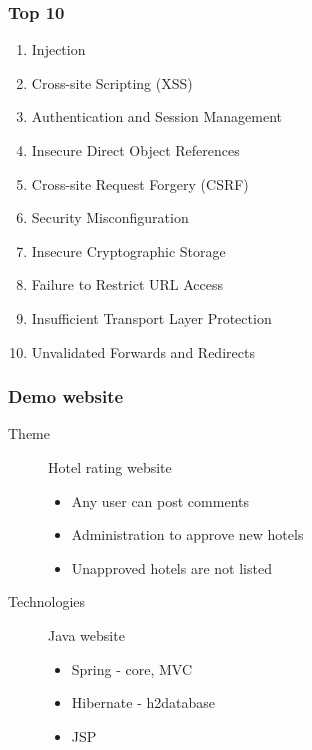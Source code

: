 \begin{frame}
\frametitle{Top 10}
\begin{enumerate}
\item Injection
\item Cross-site Scripting (XSS)
\item Authentication and Session Management
\item Insecure Direct Object References
\item Cross-site Request Forgery (CSRF)
\item Security Misconfiguration
\item Insecure Cryptographic Storage
\item Failure to Restrict URL Access
\item Insufficient Transport Layer Protection
\item Unvalidated Forwards and Redirects
\end{enumerate}
\end{frame}

\begin{frame}
\frametitle{Demo website}
\begin{description}
\item[Theme]
	Hotel rating website
	\hfill
	\begin{itemize}
	\item Any user can post comments
	\item Administration to approve new hotels
	\item Unapproved hotels are not listed
	\end{itemize}
\item[Technologies]
	Java website
	\hfill
	\begin{itemize}
	\item Spring - core, MVC
	\item Hibernate - h2database
	\item JSP
	\end{itemize}
\end{description}
\end{frame}

